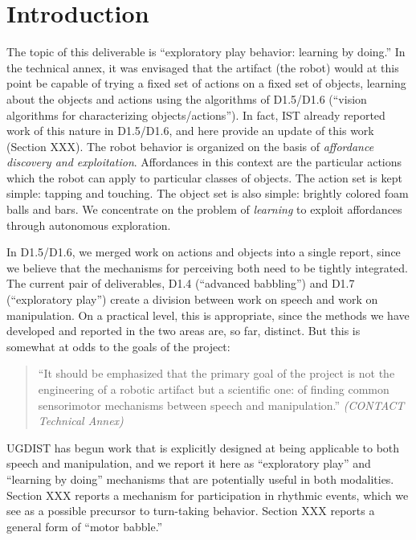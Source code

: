 
\section{Introduction}

The topic of this deliverable is ``exploratory play behavior: learning
by doing.''  In the technical annex, it was envisaged that
the artifact (the robot) would at this point be capable of trying a fixed
set of actions on a fixed set of objects, learning about the objects
and actions using the algorithms of D1.5/D1.6 (``vision algorithms for characterizing objects/actions'').
%
In fact, IST already reported work of this nature in D1.5/D1.6, 
and here provide an update of this work (Section XXX).
%
The robot behavior is organized on the basis of {\em affordance
discovery and exploitation}.  Affordances in this context are the
particular actions which the robot can apply to particular classes
of objects.  The action set is kept simple: tapping and touching.
The object set is also simple: brightly colored foam balls and
bars.  We concentrate on the problem of {\em learning} to exploit 
affordances through autonomous exploration.

In D1.5/D1.6, we merged work on actions and objects into a single
report, since we believe that the mechanisms for perceiving both
need to be tightly integrated.  The current pair of deliverables,
D1.4 (``advanced babbling'') and D1.7 (``exploratory play'')
create a division between work on speech and work on manipulation.
On a practical level, this is appropriate, since the methods we have
developed and reported in the two areas are, so far, distinct.
But this is somewhat at odds to the goals of the project:

\begin{quote}

``It should be emphasized that the primary goal of the project is not
the engineering of a robotic artifact but a scientific one: of finding
common sensorimotor mechanisms between speech and manipulation.''
{\it (CONTACT Technical Annex)}

\end{quote}

UGDIST has begun work that is explicitly designed at being applicable
to both speech and manipulation, and we report it here as
``exploratory play'' and ``learning by doing'' mechanisms that
are potentially useful in both modalities.  Section XXX reports
a mechanism for participation in rhythmic events, which we see
as a possible precursor to turn-taking behavior.  Section XXX
reports a general form of ``motor babble.''



